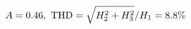 \documentclass[preview]{standalone}
\begin{document}
\begin{align*}
\special{dvisvgm:raw <g id='unique000'>}A=0.46,\ \text{THD}=\sqrt{H_2^2+H_3^2}/H_1=8.8\%\special{dvisvgm:raw </g>}
\end{align*}
\end{document}
